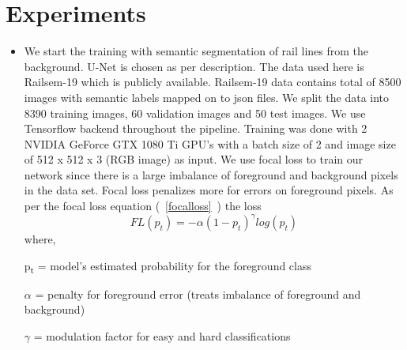 \documentclass[conference]{IEEEtran}
\begin{document}
\section{Experiments}\label{training}
\begin{itemize}
\item We start the training with semantic segmentation of rail lines from the background. U-Net is chosen as per \cite{ronneberger2015unet} description. The data used here is Railsem-19 \cite{9025646}  which is publicly available. Railsem-19 data contains total of 8500 images with semantic labels mapped on to json files. We split the data into 8390 training images, 60 validation images and 50 test images. We use Tensorflow \cite{tensorflow2015-whitepaper} backend throughout the pipeline. Training was done with 2 NVIDIA GeForce GTX 1080 Ti GPU's with a batch size of 2 and image size of 512 x 512 x 3 (RGB image) as input. We use focal loss \cite{lin2018focal} to train our network since there is a large imbalance of foreground and background pixels in the data set. Focal loss penalizes more for errors on foreground pixels. As per the focal loss equation  (~\ref{focalloss}~) the loss
\begin{equation}\label{focalloss}
    FL(p_{t})=-\alpha( 1 - p_{t})^{\gamma}log(p_{t})
\end{equation}
 where,
 
 p\textsubscript{t} = model's estimated probability for the foreground class
 
 
 $\alpha$ = penalty for foreground error (treats imbalance of foreground and background)
 
 
 $\gamma$ = modulation factor for easy and hard classifications
 

\end{itemize}
\end{document}
